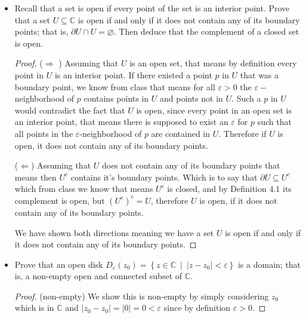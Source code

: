 \documentclass[11pt]{article}
\newenvironment{problem}[2][Problem\!]{\begin{trivlist}
\item[\hskip \labelsep {\bfseries #1}\hskip \labelsep {\bfseries #2}]}{\end{trivlist}}
\newcommand{\cc}{\mathbb C}   %
\newcommand{\abs}[1]{\left\lvert#1\right\rvert} %
\newcommand{\setp}[2]{\left\{#1\ \middle|\ #2\right\}} %
\renewcommand{\epsilon}{\varepsilon}
\renewcommand{\emptyset}{\varnothing}
\begin{document}
\begin{problem}{2.3}\hfill
\begin{itemize}[itemsep=3em]
\item[(a)] Recall that a set is open if every point of the set is an interior point. Prove that a set $U \subseteq \cc$ is open if and only if it does not contain any of its boundary points; that is, $\partial U \cap U = \emptyset$. Then deduce that the complement of a closed set is open.
\begin{example}
    \begin{proof}
        ($\Rightarrow$ ) Assuming that $U$ is an open set, that means by definition every point in $U$ is an interior point. If there existed a point $p$ in $U$ that was a boundary point, we know from class that means for all $\epsilon > 0$ the $\epsilon-$neighborhood of $p$ contains points in $U$ and points not in $U$. Such a $p$ in $U$  would contradict the fact that $U$ is open, since every point in an open set is an interior point, that means there is supposed to exist an $\epsilon$ for $p$ such that all points in the $\epsilon$-neighborhood of $p$ are contained in $U$. Therefore if $U$ is open, it does not contain any of its boundary points. 

        ($\Leftarrow$) Assuming that $U$ does not contain any of its boundary points that means then $U^{c}$ contains it's boundary points. Which is to say that $\partial U \subseteq U^{c} $ which from class we know that means $U^{c}$ is closed, and by Definition $4.1$ its complement is open, but $(U^{c})^{c} = U$, therefore $U$ is open, if it does not contain any of its boundary points. 

        We have shown both directions meaning we have a set $U$ is open if and only if it does not contain any of its boundary points. 
    \end{proof}
\end{example}

\item[(b)] Prove that an open disk $D_\epsilon(z_0) = \setp{z \in \cc}{\abs{z - z_0} < \epsilon}$ is a domain; that is, a non-empty open and connected subset of $\cc$.
\begin{example}
    \begin{proof}
        (non-empty) We show this is non-empty by simply considering $z_0$ which is in $\cc$ and $\abs{z_0 - z_0} = \abs{0} = 0 < \epsilon $ since by definition $\epsilon > 0 $.


\end{proof}
\end{example}
\end{itemize}
\end{problem}
\end{document}
